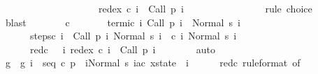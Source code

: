 \begin{isabellebody}
\ \ \ \ \ \ \ \ \ \ \ \ \ \ \ \ \ \ \ \ redex\ {\isacharparenleft}c\ i{\isacharparenright}\ {\isacharequal}\ Call\ {\isacharparenleft}p\ {\isacharparenleft}i{\isacharplus}{}{\isacharparenright}{\isacharparenright}{\isachardoublequoteclose}\isanewline
\ \ \ \ \ \ \isamarkupfalse%
\ {\isacharminus}\isanewline
\ \ \ \ \ \ \isamarkupfalse%
\ {\isacharparenleft}rule\ choice{\isacharparenright}\isanewline
\ \ \ \ \ \ \isamarkupfalse%
\ blast\isanewline
\ \ \ \ \isamarkupfalse%
\ \isamarkupfalse%
\ c\ \isanewline
\ \ \ \ \ \ termi{\isacharunderscore}c{\isacharcolon}\ {\isachardoublequoteopen}{\isasymforall}i{\isachardot}\ {\isasymGamma}{\isasymturnstile}Call\ {\isacharparenleft}p\ i{\isacharparenright}\ {\isasymdown}\ Normal\ {\isacharparenleft}s\ i{\isacharparenright}{\isachardoublequoteclose}\ \isanewline
\ \ \ \ \ \ steps{\isacharunderscore}c{\isacharcolon}\ {\isachardoublequoteopen}{\isasymforall}i{\isachardot}\ {\isasymGamma}{\isasymturnstile}\ {\isacharparenleft}Call\ {\isacharparenleft}p\ i{\isacharparenright}{\isacharcomma}\ Normal\ {\isacharparenleft}s\ i{\isacharparenright}{\isacharparenright}\ {\isasymrightarrow}\isactrlsup {\isacharplus}\ {\isacharparenleft}c\ i{\isacharcomma}\ Normal\ {\isacharparenleft}s\ {\isacharparenleft}i{\isacharplus}{}{\isacharparenright}{\isacharparenright}{\isacharparenright}{\isachardoublequoteclose}\ \isanewline
\ \ \ \ \ \ red{\isacharunderscore}c{\isacharcolon}\ \ \ {\isachardoublequoteopen}{\isasymforall}i{\isachardot}\ redex\ {\isacharparenleft}c\ i{\isacharparenright}\ {\isacharequal}\ Call\ {\isacharparenleft}p\ {\isacharparenleft}i{\isacharplus}{}{\isacharparenright}{\isacharparenright}{\isachardoublequoteclose}\isanewline
\ \ \ \ \ \ \isamarkupfalse%
\ auto\isanewline
\ \ \ \ \isamarkupfalse%
\ g\ \ {\isachardoublequoteopen}g\ i\ {\isacharequal}\ {\isacharparenleft}seq\ c\ {\isacharparenleft}p\ {}{\isacharparenright}\ i{\isacharcomma}Normal\ {\isacharparenleft}s\ i{\isacharparenright}{\isacharcolon}{\isacharcolon}{\isacharparenleft}{\isacharprime}a{\isacharcomma}{\isacharprime}c{\isacharparenright}\ xstate{\isacharparenright}{\isachardoublequoteclose}\ \ i\isanewline
\ \ \ \ \isamarkupfalse%
\ red{\isacharunderscore}c\ {\isacharbrackleft}rule{\isacharunderscore}format{\isacharcomma}\ of\ {}{\isacharbrackright}\isanewline
\ \ \ \ \isamarkupfalse%

\end{isabellebody}
